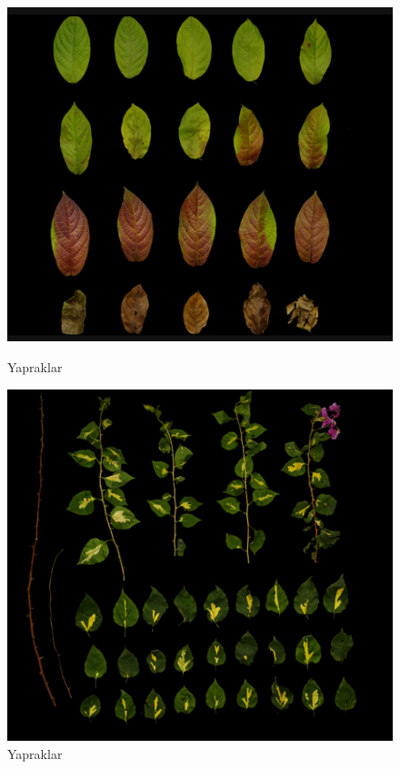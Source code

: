 \documentclass[12pt, a4paper]{article}
\begin{document}
	\begin{figure}[!htb]
		\begin{minipage}{0.48\textwidth}
			\centering
			\includegraphics[width=.7\linewidth]{leaves.png}
			\caption{Yapraklar}\label{Fig:Data3}
		\end{minipage}\hfill
		\begin{minipage}{0.48\textwidth}
			\centering
			\includegraphics[width=.7\linewidth]{bush_leaf.png}
			\caption{Yapraklar}\label{Fig:Data4}
		\end{minipage}
	\end{figure}
\end{document}
